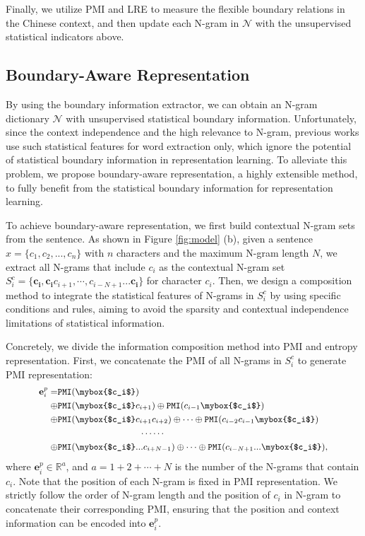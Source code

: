 \documentclass[11pt]{article}
\begin{document}
\begin{CJK}{UTF8}{gbsn}
Finally, we utilize PMI and LRE to measure the flexible boundary relations in the Chinese context,
and then update each N-gram in $\mathcal{N}$ with the unsupervised statistical indicators above.


\subsection{Boundary-Aware Representation}
\label{sec:encode}
By using the boundary information extractor, we can obtain an N-gram dictionary $\mathcal{N}$ with unsupervised statistical boundary information.
Unfortunately, since the context independence and the high relevance to N-gram,
previous works \cite{ding-etal-2020-coupling, xiao-etal-2021-ernie} use such statistical features for word extraction only,
which ignore the potential of statistical boundary information in representation learning.
To alleviate this problem, we propose boundary-aware representation,
a highly extensible method, to fully benefit from the statistical boundary information for representation learning.


To achieve boundary-aware representation, we first build contextual N-gram sets from the sentence.
As shown in Figure \ref{fig:model} (b), given a sentence $x = \{c_1, c_2, ..., c_n\}$ with $n$ characters and the maximum N-gram length $N$,
we extract all N-grams that include $c_i$ as the contextual N-gram set $S^{c}_i = \{\bm{c_i}, \bm{c_i}c_{i+1}, \cdots, c_{i-N+1} ... \bm{c_i}\}$ for character $c_i$.
Then, we design a composition method to integrate the statistical features of N-grams in $S^{c}_i$ by using specific conditions and rules,
aiming to avoid the sparsity and contextual independence limitations of statistical information.


Concretely, we divide the information composition method into PMI and entropy representation.
First, we concatenate the PMI of all N-grams in $S^{c}_i$ to generate PMI representation:
\begin{equation}
  \small
  \begin{split}
    \mathbf{e}_i^{p} = & \texttt{PMI}(\mybox{$c_i$}) \\
    \oplus & \texttt{PMI}(\mybox{$c_i$}c_{i+1}) \oplus \texttt{PMI}(c_{i-1}\mybox{$c_i$}) \\
    \oplus & \texttt{PMI}(\mybox{$c_i$}c_{i+1}c_{i+2}) \oplus \cdots \oplus \texttt{PMI}(c_{i-2}c_{i-1}\mybox{$c_i$})\\
    & ~~~~~~~~~~~~~~~~~~~~~~~~~~~ \cdots \cdots  \\
    \oplus & \texttt{PMI}(\mybox{$c_i$} ... c_{i+N-1}) \oplus \cdots \oplus \texttt{PMI}(c_{i-N+1} ... \mybox{$c_i$}),
  \end{split}
\end{equation}
where $\mathbf{e}_i^{p} \in \mathbb{R}^{a}$, and $a = 1+2+\cdots+N$ is the number of the N-grams that contain $c_i$.
Note that the position of each N-gram is fixed in PMI representation.
We strictly follow the order of N-gram length and the position of $c_i$ in N-gram to concatenate their corresponding PMI,
ensuring that the position and context information can be encoded into $\mathbf{e}_i^{p}$.



\end{CJK}
\end{document}
